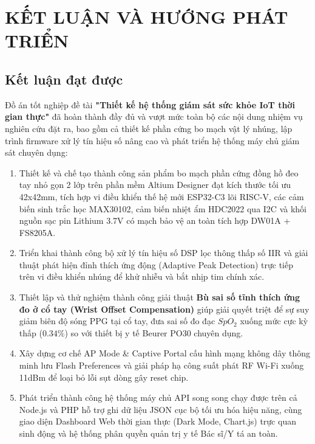 \section*{KẾT LUẬN VÀ HƯỚNG PHÁT TRIỂN}

\subsection*{Kết luận đạt được}
Đồ án tốt nghiệp đề tài \textbf{"Thiết kế hệ thống giám sát sức khỏe IoT thời gian thực"} đã hoàn thành đầy đủ và vượt mức toàn bộ các nội dung nhiệm vụ nghiên cứu đặt ra, bao gồm cả thiết kế phần cứng bo mạch vật lý nhúng, lập trình firmware xử lý tín hiệu số nâng cao và phát triển hệ thống máy chủ giám sát chuyên dụng:
\begin{enumerate}
    \item Thiết kế và chế tạo thành công sản phẩm bo mạch phần cứng đồng hồ đeo tay nhỏ gọn 2 lớp trên phần mềm Altium Designer đạt kích thước tối ưu 42x42mm, tích hợp vi điều khiển thế hệ mới ESP32-C3 lõi RISC-V, các cảm biến sinh trắc học MAX30102, cảm biến nhiệt ẩm HDC2022 qua I2C và khối nguồn sạc pin Lithium 3.7V có mạch bảo vệ an toàn tích hợp DW01A + FS8205A.
    \item Triển khai thành công bộ xử lý tín hiệu số DSP lọc thông thấp số IIR và giải thuật phát hiện đỉnh thích ứng động (Adaptive Peak Detection) trực tiếp trên vi điều khiển nhúng để khử nhiễu và bắt nhịp tim chính xác.
    \item Thiết lập và thử nghiệm thành công giải thuật \textbf{Bù sai số tĩnh thích ứng đo ở cổ tay (Wrist Offset Compensation)} giúp giải quyết triệt để sự suy giảm biên độ sóng PPG tại cổ tay, đưa sai số đo đạc $SpO_2$ xuống mức cực kỳ thấp ($0.34\%$) so với thiết bị y tế Beurer PO30 chuyên dụng.
    \item Xây dựng cơ chế AP Mode \& Captive Portal cấu hình mạng không dây thông minh lưu Flash Preferences và giải pháp hạ công suất phát RF Wi-Fi xuống 11dBm để loại bỏ lỗi sụt dòng gây reset chip.
    \item Phát triển thành công hệ thống máy chủ API song song chạy được trên cả Node.js và PHP hỗ trợ ghi dữ liệu JSON cục bộ tối ưu hóa hiệu năng, cùng giao diện Dashboard Web thời gian thực (Dark Mode, Chart.js) trực quan sinh động và hệ thống phân quyền quản trị y tế Bác sĩ/Y tá an toàn.
\end{enumerate}

